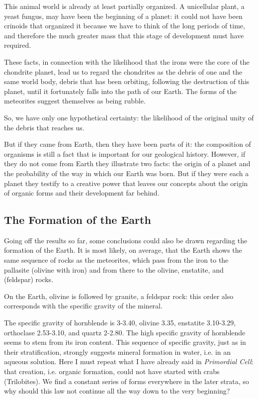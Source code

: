 \documentclass[a4paper, 12pt, oneside]{article}
\begin{document}
This animal world is already at least partially organized. A unicellular plant, a yeast fungus, may have been the beginning of a planet: it could not have been crinoids that organized it because we have to think of the long periods of time, and therefore the much greater mass that this stage of development must have required.

These facts, in connection with the likelihood that the irons were the core of the chondrite planet, lead us to regard the chondrites as the debris of one and the same world body, debris that has been orbiting, following the destruction of this planet, until it fortunately falls into the path of our Earth. The forms of the meteorites suggest themselves as being rubble.

So, we have only one hypothetical certainty: the likelihood of the original unity of the debris that reaches us.

But if they came from Earth, then they have been parts of it: the composition of organisms is still a fact that is important for our geological history. However, if they do not come from Earth they illustrate two facts: the origin of a planet and the probability of the way in which our Earth was born. But if they were each a planet they testify to a creative power that leaves our concepts about the origin of organic forms and their development far behind.
\clearpage
\subsection{The Formation of the Earth}
Going off the results so far, some conclusions could also be drawn regarding the formation of the Earth. It is most likely, on average, that the Earth shows the same sequence of rocks as the meteorites, which pass from the iron to the pallasite (olivine with iron) and from there to the olivine, enstatite, and (feldspar) rocks.

On the Earth, olivine is followed by granite, a feldspar rock: this order also corresponds with the specific gravity of the mineral.

The specific gravity of hornblende is 3-3.40, olivine 3.35, enstatite 3.10-3.29, orthoclase 2.53-3.10, and quartz 2-2.80. The high specific gravity of hornblende seems to stem from its iron content. This sequence of specific gravity, just as in their stratification, strongly suggests mineral formation in water, i.e. in an aqueous solution. Here I must repeat what I have already said in \emph{Primordial Cell}: that creation, i.e. organic formation, could not have started with crabs (Trilobites). We find a constant series of forms everywhere in the later strata, so why should this law not continue all the way down to the very beginning?
\end{document}

